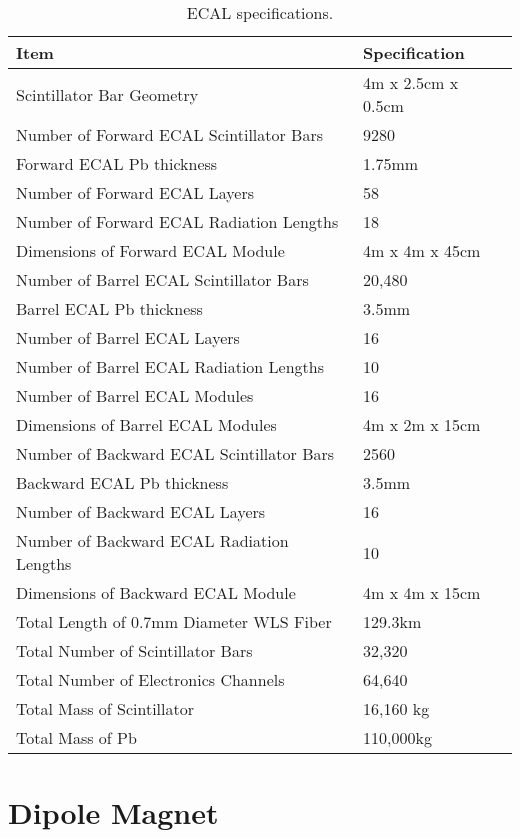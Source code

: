 \documentclass[aps,prl,preprint,groupedaddress]{revtex4}
\begin{document}
\begin{table}
\centering
  \caption{\label{ECAL_specs} ECAL specifications.}
  \begin{tabular}{| l | l |}
    \hline
Item&Specification \\
    \hline
Scintillator Bar Geometry & 4m x 2.5cm x 0.5cm \\
Number of Forward ECAL Scintillator Bars & 9280 \\
Forward ECAL Pb thickness & 1.75mm \\
Number of Forward ECAL Layers & 58 \\
Number of Forward ECAL Radiation Lengths & 18 \\
Dimensions of Forward ECAL Module & 4m x 4m x 45cm \\
Number of Barrel ECAL Scintillator Bars & 20,480 \\
Barrel ECAL Pb thickness & 3.5mm \\
Number of Barrel ECAL Layers & 16 \\
Number of Barrel ECAL Radiation Lengths & 10 \\
Number of Barrel ECAL Modules & 16 \\
Dimensions of Barrel ECAL Modules & 4m x 2m x 15cm \\
Number of Backward ECAL Scintillator Bars & 2560 \\
Backward ECAL Pb thickness & 3.5mm \\
Number of Backward ECAL Layers & 16 \\
Number of Backward ECAL Radiation Lengths & 10 \\
Dimensions of Backward ECAL Module & 4m x 4m x 15cm \\
Total Length of 0.7mm Diameter WLS Fiber & 129.3km \\
Total Number of Scintillator Bars & 32,320 \\
Total Number of Electronics Channels & 64,640 \\
Total Mass of Scintillator & 16,160 kg \\
Total Mass of Pb & 110,000kg \\
     \hline
  \end{tabular}
\end{table}

\section{Dipole Magnet} 
\end{document}
